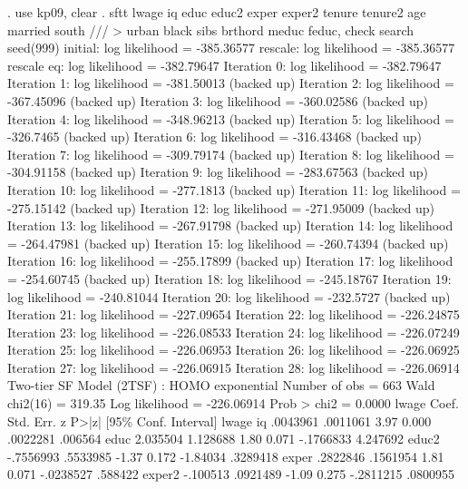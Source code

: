 . use kp09, clear
{\smallskip}
. sftt lwage iq educ educ2 exper exper2 tenure tenure2 age married south ///
>          urban black sibs brthord meduc feduc, check search seed(999)
{\smallskip}
initial:       log likelihood = -385.36577
rescale:       log likelihood = -385.36577
rescale eq:    log likelihood = -382.79647
Iteration 0:   log likelihood = -382.79647  
Iteration 1:   log likelihood = -381.50013  (backed up)
Iteration 2:   log likelihood = -367.45096  (backed up)
Iteration 3:   log likelihood = -360.02586  (backed up)
Iteration 4:   log likelihood = -348.96213  (backed up)
Iteration 5:   log likelihood =  -326.7465  (backed up)
Iteration 6:   log likelihood = -316.43468  (backed up)
Iteration 7:   log likelihood = -309.79174  (backed up)
Iteration 8:   log likelihood = -304.91158  (backed up)
Iteration 9:   log likelihood = -283.67563  (backed up)
Iteration 10:  log likelihood =  -277.1813  (backed up)
Iteration 11:  log likelihood = -275.15142  (backed up)
Iteration 12:  log likelihood = -271.95009  (backed up)
Iteration 13:  log likelihood = -267.91798  (backed up)
Iteration 14:  log likelihood = -264.47981  (backed up)
Iteration 15:  log likelihood = -260.74394  (backed up)
Iteration 16:  log likelihood = -255.17899  (backed up)
Iteration 17:  log likelihood = -254.60745  (backed up)
Iteration 18:  log likelihood = -245.18767  
Iteration 19:  log likelihood = -240.81044  
Iteration 20:  log likelihood =  -232.5727  (backed up)
Iteration 21:  log likelihood = -227.09654  
Iteration 22:  log likelihood = -226.24875  
Iteration 23:  log likelihood = -226.08533  
Iteration 24:  log likelihood = -226.07249  
Iteration 25:  log likelihood = -226.06953  
Iteration 26:  log likelihood = -226.06925  
Iteration 27:  log likelihood = -226.06915  
Iteration 28:  log likelihood = -226.06914  
{\smallskip}
Two-tier SF Model (2TSF) : HOMO exponential       Number of obs   =        663
                                                  Wald chi2(16)   =     319.35
Log likelihood = -226.06914                       Prob > chi2     =     0.0000
{\smallskip}
       lwage {\VBAR}      Coef.   Std. Err.      z    P>|z|     [95\% Conf. Interval]
lwage        {\VBAR}
          iq {\VBAR}   .0043961   .0011061     3.97   0.000     .0022281     .006564
        educ {\VBAR}   2.035504   1.128688     1.80   0.071    -.1766833    4.247692
       educ2 {\VBAR}  -.7556993   .5533985    -1.37   0.172     -1.84034    .3289418
       exper {\VBAR}   .2822846   .1561954     1.81   0.071    -.0238527     .588422
      exper2 {\VBAR}   -.100513   .0921489    -1.09   0.275    -.2811215    .0800955
